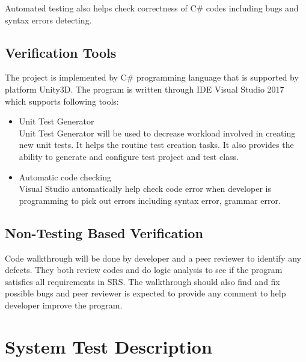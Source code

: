 \documentclass[12pt, titlepage]{article}
\begin{document}
Automated testing also helps check correctness of C$\#$ codes including bugs and syntax errors detecting.
 
\subsection{Verification Tools}

The project is implemented by C$\#$ programming language that is supported by platform Unity3D. The program is written through IDE Visual Studio 2017 which supports following tools:

\begin{itemize}
	\item Unit Test Generator\\
	
	Unit Test Generator will be used to decrease workload involved in creating new unit tests. It helps the routine test creation tasks. It also provides the ability to generate and configure test project and test class. 
	
\end{itemize}

\begin{itemize}
	\item Automatic code checking\\
	
	Visual Studio automatically help check code error when developer is programming to pick out errors including syntax error, grammar error. 	
\end{itemize}
		

\subsection{Non-Testing Based Verification}
Code walkthrough will be done by developer and a peer reviewer to identify any defects. They both review codes and do logic analysis to see if the program satisfies all requirements in SRS. The walkthrough should also find and fix possible bugs and peer reviewer is expected to provide any comment to help developer improve the program.
\section{System Test Description}
\end{document}
